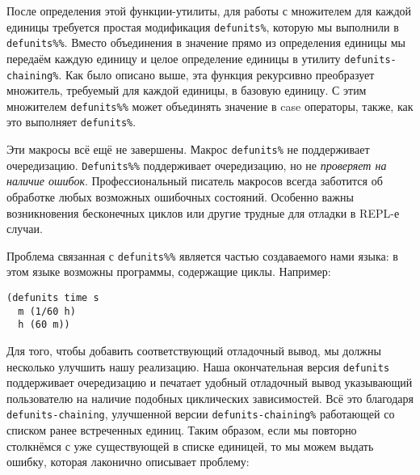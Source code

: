 После определения этой функции-утилиты, для работы с множителем для каждой единицы требуется простая модификация \verb"defunits%", которую мы выполнили в \verb"defunits%%". Вместо объединения в значение прямо из определения единицы мы передаём каждую единицу и целое определение единицы в утилиту \verb"defunits-chaining%". Как было описано выше, эта функция рекурсивно преобразует множитель, требуемый для каждой единицы, в базовую единицу. С этим множителем \verb"defunits%%" может объединять значение в case операторы, также, как это выполняет \verb"defunits%".

Эти макросы всё ещё не завершены. Макрос \verb"defunits%" не поддерживает очередизацию. \verb"Defunits%%" поддерживает очередизацию, но не \emph{проверяет на наличие ошибок}. Профессиональный писатель макросов всегда заботится об обработке любых возможных ошибочных состояний. Особенно важны возникновения бесконечных циклов или другие трудные для отладки в REPL-е случаи.

Проблема связанная с \verb"defunits%%" является частью создаваемого нами языка: в этом языке возможны программы, содержащие циклы. Например:

\begin{verbatim}
(defunits time s
  m (1/60 h)
  h (60 m))
\end{verbatim}

Для того, чтобы добавить соответствующий отладочный вывод, мы должны несколько улучшить нашу реализацию. Наша окончательная версия \verb"defunits" поддерживает очередизацию и печатает удобный отладочный вывод указывающий пользователю на наличие подобных циклических зависимостей. Всё это благодаря \verb"defunits-chaining", улучшенной версии \verb"defunits-chaining%" работающей со списком ранее встреченных единиц. Таким образом, если мы повторно столкнёмся с уже существующей в списке единицей, то мы можем выдать ошибку, которая лаконично описывает проблему:

